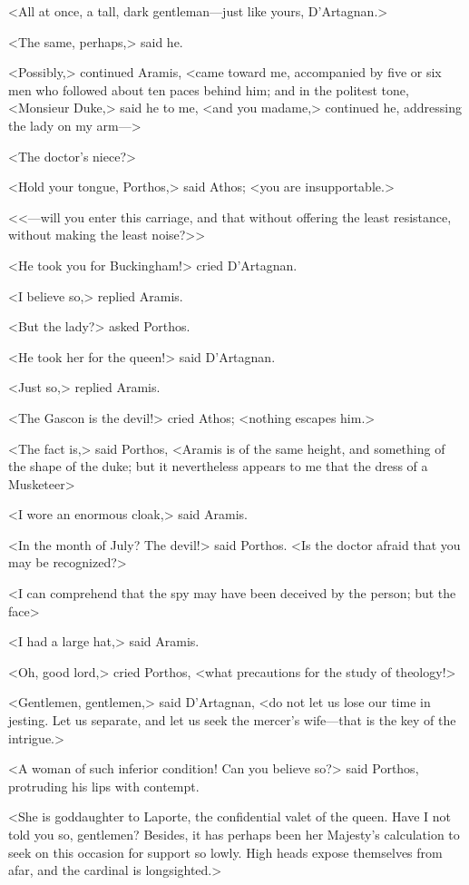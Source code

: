 <All at once, a tall, dark gentleman—just like yours, D'Artagnan.> 

<The same, perhaps,> said he. 

<Possibly,> continued Aramis, <came toward me, accompanied by five or six men who followed about ten paces behind him; and in the politest tone, <Monsieur Duke,> said he to me, <and you madame,> continued he, addressing the lady on my arm—> 

<The doctor's niece?> 

<Hold your tongue, Porthos,> said Athos; <you are insupportable.> 

<<—will you enter this carriage, and that without offering the least resistance, without making the least noise?>> 

<He took you for Buckingham!> cried D'Artagnan. 

<I believe so,> replied Aramis. 

<But the lady?> asked Porthos. 

<He took her for the queen!> said D'Artagnan. 

<Just so,> replied Aramis. 

<The Gascon is the devil!> cried Athos; <nothing escapes him.> 

<The fact is,> said Porthos, <Aramis is of the same height, and something of the shape of the duke; but it nevertheless appears to me that the dress of a Musketeer\longdash> 

<I wore an enormous cloak,> said Aramis. 

<In the month of July? The devil!> said Porthos. <Is the doctor afraid that you may be recognized?> 

<I can comprehend that the spy may have been deceived by the person; but the face\longdash> 

<I had a large hat,> said Aramis. 

<Oh, good lord,> cried Porthos, <what precautions for the study of theology!> 

<Gentlemen, gentlemen,> said D'Artagnan, <do not let us lose our time in jesting. Let us separate, and let us seek the mercer's wife—that is the key of the intrigue.> 

<A woman of such inferior condition! Can you believe so?> said Porthos, protruding his lips with contempt. 

<She is goddaughter to Laporte, the confidential valet of the queen. Have I not told you so, gentlemen? Besides, it has perhaps been her Majesty's calculation to seek on this occasion for support so lowly. High heads expose themselves from afar, and the cardinal is longsighted.> 

